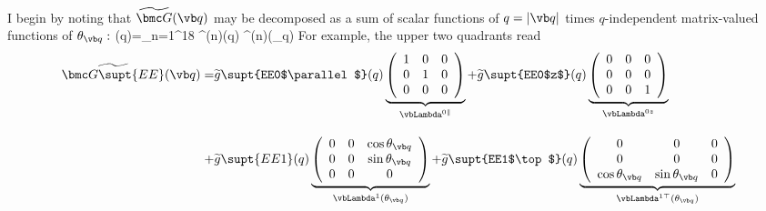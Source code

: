 \documentclass[letterpaper]{article}
\renewcommand{\wt}{\widetilde}
\begin{document}
I begin by noting that $\wt{\bmc G}(\vb q)$ may be decomposed as a sum
of scalar functions of $q=|\vb q|$ times $q$-independent
matrix-valued functions of $\theta_{\vb q}:$
{
  \wt{\bmc G}(\vb q)=\sum_{n=1}^{18}
  \wt{g}^{(n)}(q) \vbLambda^{(n)}(\theta_{\vb q})
}
For example, the upper two quadrants read
\begin{align*}
 \wt{\bmc G\supt{EE}}(\vb q)
 = &\wt{g}\supt{EE0$\parallel$}(q)
    \underbrace{ \left(\begin{array}{ccc}
                       1 & 0 & 0 \\ 
                       0 & 1 & 0 \\ 
                       0 & 0 & 0 \\ 
                 \end{array}\right)
               }_{\vbLambda^{0\parallel}}
  + \wt{g}\supt{EE0$z$}(q)
    \underbrace{ \left(\begin{array}{ccc}
                       0 & 0 & 0 \\ 
                       0 & 0 & 0 \\ 
                       0 & 0 & 1 \\ 
                 \end{array}\right)
               }_{\vbLambda^{0z}}
\\[10pt]
 + &\wt{g}\supt{EE1}(q)
    \underbrace{ \left(\begin{array}{ccc}
                       0 & 0 & \cos\theta_{\vb q} \\ 
                       0 & 0 & \sin\theta_{\vb q} \\ 
                       0 & 0 & 0
                 \end{array}\right)
               }_{\vbLambda^{1}(\theta_{\vb q})}
 +  \wt{g}\supt{EE1$\top$}(q)
    \underbrace{ \left(\begin{array}{ccc}
                       0 & 0 & 0 \\
                       0 & 0 & 0 \\
                       \cos\theta_{\vb q} & \sin\theta_{\vb q} & 0
                 \end{array}\right)
               }_{\vbLambda^{1\top}(\theta_{\vb q})}
\\[10pt]

\end{align*}
\end{document}
